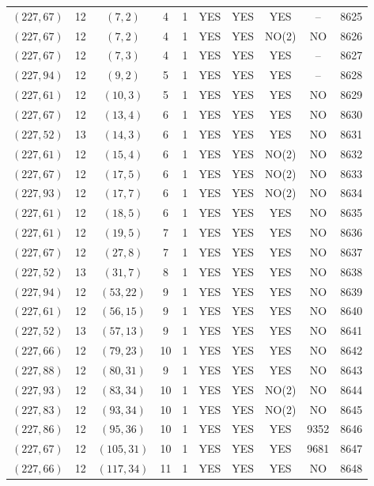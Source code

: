 \begin{longtable}{|c|c|c|c|c|c|c|c|c|c|}
$(227, 67)$ & 12 & $(7, 2)$ & 4 & 1 & YES & YES & YES & -- & 8625\\
$(227, 67)$ & 12 & $(7, 2)$ & 4 & 1 & YES & YES & NO(2) & NO & 8626\\
$(227, 67)$ & 12 & $(7, 3)$ & 4 & 1 & YES & YES & YES & -- & 8627\\
$(227, 94)$ & 12 & $(9, 2)$ & 5 & 1 & YES & YES & YES & -- & 8628\\
$(227, 61)$ & 12 & $(10, 3)$ & 5 & 1 & YES & YES & YES & NO & 8629\\
$(227, 67)$ & 12 & $(13, 4)$ & 6 & 1 & YES & YES & YES & NO & 8630\\
$(227, 52)$ & 13 & $(14, 3)$ & 6 & 1 & YES & YES & YES & NO & 8631\\
$(227, 61)$ & 12 & $(15, 4)$ & 6 & 1 & YES & YES & NO(2) & NO & 8632\\
$(227, 67)$ & 12 & $(17, 5)$ & 6 & 1 & YES & YES & NO(2) & NO & 8633\\
$(227, 93)$ & 12 & $(17, 7)$ & 6 & 1 & YES & YES & NO(2) & NO & 8634\\
$(227, 61)$ & 12 & $(18, 5)$ & 6 & 1 & YES & YES & YES & NO & 8635\\
$(227, 61)$ & 12 & $(19, 5)$ & 7 & 1 & YES & YES & YES & NO & 8636\\
$(227, 67)$ & 12 & $(27, 8)$ & 7 & 1 & YES & YES & YES & NO & 8637\\
$(227, 52)$ & 13 & $(31, 7)$ & 8 & 1 & YES & YES & YES & NO & 8638\\
$(227, 94)$ & 12 & $(53, 22)$ & 9 & 1 & YES & YES & YES & NO & 8639\\
$(227, 61)$ & 12 & $(56, 15)$ & 9 & 1 & YES & YES & YES & NO & 8640\\
$(227, 52)$ & 13 & $(57, 13)$ & 9 & 1 & YES & YES & YES & NO & 8641\\
$(227, 66)$ & 12 & $(79, 23)$ & 10 & 1 & YES & YES & YES & NO & 8642\\
$(227, 88)$ & 12 & $(80, 31)$ & 9 & 1 & YES & YES & YES & NO & 8643\\
$(227, 93)$ & 12 & $(83, 34)$ & 10 & 1 & YES & YES & NO(2) & NO & 8644\\
$(227, 83)$ & 12 & $(93, 34)$ & 10 & 1 & YES & YES & NO(2) & NO & 8645\\
$(227, 86)$ & 12 & $(95, 36)$ & 10 & 1 & YES & YES & YES & 9352 & 8646\\
$(227, 67)$ & 12 & $(105, 31)$ & 10 & 1 & YES & YES & YES & 9681 & 8647\\
$(227, 66)$ & 12 & $(117, 34)$ & 11 & 1 & YES & YES & YES & NO & 8648\\

\end{longtable}
